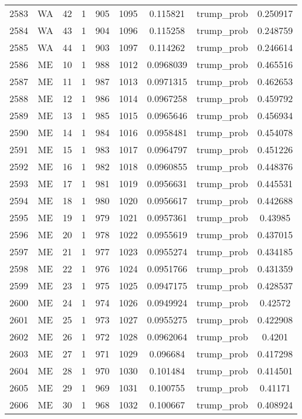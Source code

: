 \documentclass[12pt,a4paper]{article}
\begin{document}
\begin{tabular}{r|cccccccc}
	2583 & WA & 42 & 1 & 905 & 1095 & 0.115821 & trump\_prob & 0.250917 \\
	2584 & WA & 43 & 1 & 904 & 1096 & 0.115258 & trump\_prob & 0.248759 \\
	2585 & WA & 44 & 1 & 903 & 1097 & 0.114262 & trump\_prob & 0.246614 \\
	2586 & ME & 10 & 1 & 988 & 1012 & 0.0968039 & trump\_prob & 0.465516 \\
	2587 & ME & 11 & 1 & 987 & 1013 & 0.0971315 & trump\_prob & 0.462653 \\
	2588 & ME & 12 & 1 & 986 & 1014 & 0.0967258 & trump\_prob & 0.459792 \\
	2589 & ME & 13 & 1 & 985 & 1015 & 0.0965646 & trump\_prob & 0.456934 \\
	2590 & ME & 14 & 1 & 984 & 1016 & 0.0958481 & trump\_prob & 0.454078 \\
	2591 & ME & 15 & 1 & 983 & 1017 & 0.0964797 & trump\_prob & 0.451226 \\
	2592 & ME & 16 & 1 & 982 & 1018 & 0.0960855 & trump\_prob & 0.448376 \\
	2593 & ME & 17 & 1 & 981 & 1019 & 0.0956631 & trump\_prob & 0.445531 \\
	2594 & ME & 18 & 1 & 980 & 1020 & 0.0956617 & trump\_prob & 0.442688 \\
	2595 & ME & 19 & 1 & 979 & 1021 & 0.0957361 & trump\_prob & 0.43985 \\
	2596 & ME & 20 & 1 & 978 & 1022 & 0.0955619 & trump\_prob & 0.437015 \\
	2597 & ME & 21 & 1 & 977 & 1023 & 0.0955274 & trump\_prob & 0.434185 \\
	2598 & ME & 22 & 1 & 976 & 1024 & 0.0951766 & trump\_prob & 0.431359 \\
	2599 & ME & 23 & 1 & 975 & 1025 & 0.0947175 & trump\_prob & 0.428537 \\
	2600 & ME & 24 & 1 & 974 & 1026 & 0.0949924 & trump\_prob & 0.42572 \\
	2601 & ME & 25 & 1 & 973 & 1027 & 0.0955275 & trump\_prob & 0.422908 \\
	2602 & ME & 26 & 1 & 972 & 1028 & 0.0962064 & trump\_prob & 0.4201 \\
	2603 & ME & 27 & 1 & 971 & 1029 & 0.096684 & trump\_prob & 0.417298 \\
	2604 & ME & 28 & 1 & 970 & 1030 & 0.101484 & trump\_prob & 0.414501 \\
	2605 & ME & 29 & 1 & 969 & 1031 & 0.100755 & trump\_prob & 0.41171 \\
	2606 & ME & 30 & 1 & 968 & 1032 & 0.100667 & trump\_prob & 0.408924 \\

\end{tabular}
\end{document}
